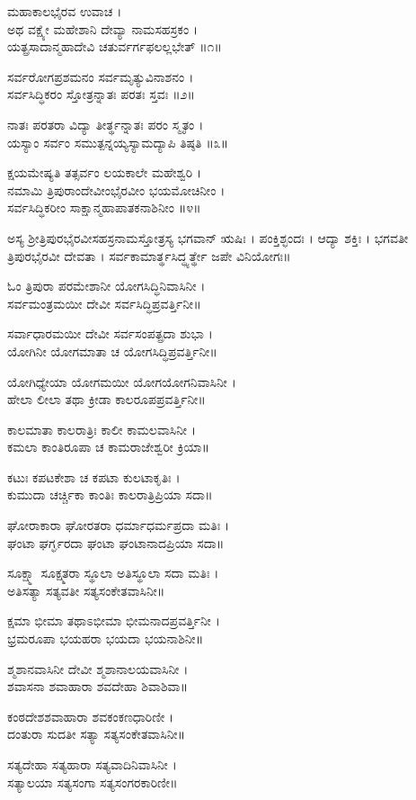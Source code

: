 ಮಹಾಕಾಲಭೈರವ ಉವಾಚ ।\\
ಅಥ ವಕ್ಷ್ಯೇ ಮಹೇಶಾನಿ ದೇವ್ಯಾ ನಾಮಸಹಸ್ರಕಂ ।\\
ಯತ್ಪ್ರಸಾದಾನ್ಮಹಾದೇವಿ ಚತುರ್ವರ್ಗಫಲಲ್ಲಭೇತ್ ॥೧॥

ಸರ್ವರೋಗಪ್ರಶಮನಂ ಸರ್ವಮೃತ್ಯುವಿನಾಶನಂ ।\\
ಸರ್ವಸಿದ್ಧಿಕರಂ ಸ್ತೋತ್ರನ್ನಾತಃ ಪರತಃ ಸ್ತವಃ ॥೨॥

ನಾತಃ ಪರತರಾ ವಿದ್ಯಾ ತೀರ್ತ್ಥನ್ನಾತಃ ಪರಂ ಸ್ಮೃತಂ ।\\
ಯಸ್ಯಾಂ ಸರ್ವಂ ಸಮುತ್ಪನ್ನಯ್ಯಸ್ಯಾಮದ್ಯಾಪಿ ತಿಷ್ಠತಿ ॥೩॥

ಕ್ಷಯಮೇಷ್ಯತಿ ತತ್ಸರ್ವಂ ಲಯಕಾಲೇ ಮಹೇಶ್ವರಿ ।\\
ನಮಾಮಿ ತ್ರಿಪುರಾಂದೇವೀಂಭೈರವೀಂ ಭಯಮೋಚಿನೀಂ ।\\
ಸರ್ವಸಿದ್ಧಿಕರೀಂ ಸಾಕ್ಷಾನ್ಮಹಾಪಾತಕನಾಶಿನೀಂ ॥೪॥

ಅಸ್ಯ ಶ್ರೀತ್ರಿಪುರಭೈರವೀಸಹಸ್ರನಾಮಸ್ತೋತ್ರಸ್ಯ ಭಗವಾನ್ ಋಷಿಃ । ಪಂಕ್ತಿಶ್ಛಂದಃ । ಆದ್ಯಾ ಶಕ್ತಿಃ । ಭಗವತೀ ತ್ರಿಪುರಭೈರವೀ ದೇವತಾ । ಸರ್ವಕಾಮಾರ್ತ್ಥಸಿದ್ಧ್ಯರ್ತ್ಥೇ ಜಪೇ ವಿನಿಯೋಗಃ॥

ಓಂ ತ್ರಿಪುರಾ ಪರಮೇಶಾನೀ ಯೋಗಸಿದ್ಧಿನಿವಾಸಿನೀ ।\\
ಸರ್ವಮಂತ್ರಮಯೀ ದೇವೀ ಸರ್ವಸಿದ್ಧಿಪ್ರವರ್ತ್ತಿನೀ॥

ಸರ್ವಾಧಾರಮಯೀ ದೇವೀ ಸರ್ವಸಂಪತ್ಪ್ರದಾ ಶುಭಾ ।\\
ಯೋಗಿನೀ ಯೋಗಮಾತಾ ಚ ಯೋಗಸಿದ್ಧಿಪ್ರವರ್ತ್ತಿನೀ॥

ಯೋಗಿಧ್ಯೇಯಾ ಯೋಗಮಯೀ ಯೋಗಯೋಗನಿವಾಸಿನೀ ।\\
ಹೇಲಾ ಲೀಲಾ ತಥಾ ಕ್ರೀಡಾ ಕಾಲರೂಪಪ್ರವರ್ತ್ತಿನೀ॥

ಕಾಲಮಾತಾ ಕಾಲರಾತ್ರಿಃ ಕಾಲೀ ಕಾಮಲವಾಸಿನೀ ।\\
ಕಮಲಾ ಕಾಂತಿರೂಪಾ ಚ ಕಾಮರಾಜೇಶ್ವರೀ ಕ್ರಿಯಾ॥

ಕಟುಃ ಕಪಟಕೇಶಾ ಚ ಕಪಟಾ ಕುಲಟಾಕೃತಿಃ ।\\
ಕುಮುದಾ ಚರ್ಚ್ಚಿಕಾ ಕಾಂತಿಃ ಕಾಲರಾತ್ರಿಪ್ರಿಯಾ ಸದಾ॥

ಘೋರಾಕಾರಾ ಘೋರತರಾ ಧರ್ಮಾಧರ್ಮಪ್ರದಾ ಮತಿಃ ।\\
ಘಂಟಾ ಘರ್ಗ್ಘರದಾ ಘಂಟಾ ಘಂಟಾನಾದಪ್ರಿಯಾ ಸದಾ॥

ಸೂಕ್ಷ್ಮಾ ಸೂಕ್ಷ್ಮತರಾ ಸ್ಥೂಲಾ ಅತಿಸ್ಥೂಲಾ ಸದಾ ಮತಿಃ ।\\
ಅತಿಸತ್ಯಾ ಸತ್ಯವತೀ ಸತ್ಯಸಂಕೇತವಾಸಿನೀ॥

ಕ್ಷಮಾ ಭೀಮಾ ತಥಾಽಭೀಮಾ ಭೀಮನಾದಪ್ರವರ್ತ್ತಿನೀ ।\\
ಭ್ರಮರೂಪಾ ಭಯಹರಾ ಭಯದಾ ಭಯನಾಶಿನೀ॥

ಶ್ಮಶಾನವಾಸಿನೀ ದೇವೀ ಶ್ಮಶಾನಾಲಯವಾಸಿನೀ ।\\
ಶವಾಸನಾ ಶವಾಹಾರಾ ಶವದೇಹಾ ಶಿವಾಶಿವಾ॥

ಕಂಠದೇಶಶವಾಹಾರಾ ಶವಕಂಕಣಧಾರಿಣೀ ।\\
ದಂತುರಾ ಸುದತೀ ಸತ್ಯಾ ಸತ್ಯಸಂಕೇತವಾಸಿನೀ॥

ಸತ್ಯದೇಹಾ ಸತ್ಯಹಾರಾ ಸತ್ಯವಾದಿನಿವಾಸಿನೀ ।\\
ಸತ್ಯಾಲಯಾ ಸತ್ಯಸಂಗಾ ಸತ್ಯಸಂಗರಕಾರಿಣೀ॥

